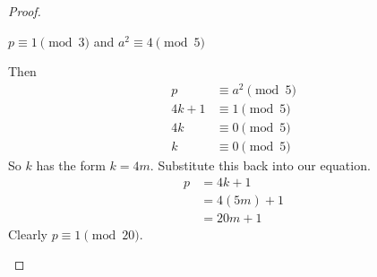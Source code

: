 \begin{proof}
\begin{case}
$p \equiv 1 \pmod 3$ and $a^2 \equiv 4 \pmod 5$

Then
\begin{align*}
		  p &\equiv a^2 \pmod 5 \\
	 4k + 1 &\equiv 1 \pmod 5 \\
	     4k &\equiv 0 \pmod 5 \\
	      k &\equiv 0 \pmod 5
\end{align*}
So $k$ has the form $k=4m$. Substitute this back into our equation.
\begin{align*}
	p &= 4k + 1 \\
	  &= 4(5m) + 1 \\
	  &= 20m + 1
\end{align*}
Clearly $p \equiv 1 \pmod{20}$.
\end{case}

\end{proof}

